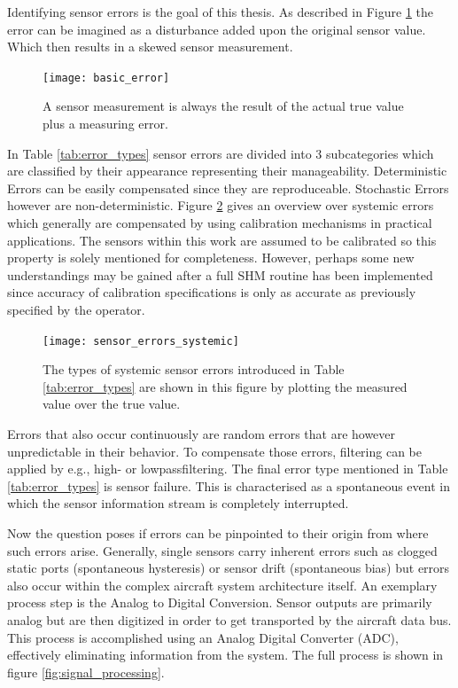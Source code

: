 Identifying sensor errors is the goal of this thesis. As described in Figure \ref{fig:basic_error} the error can be imagined as a disturbance added upon the original sensor value. Which then results in a skewed sensor measurement.
\begin{figure}[ht]
    \centering
    \texttt{[image: basic\_error]}
    \caption{A sensor measurement is always the result of the actual true value plus a measuring error.}
    \label{fig:basic_error}
\end{figure}
In Table \ref{tab:error_types} sensor errors are divided into 3 subcategories which are classified by their appearance representing their manageability. Deterministic Errors can be easily compensated since they are reproduceable. Stochastic Errors however are non-deterministic. Figure \ref{fig:sensor_errors_systemic} gives an overview over systemic errors which generally are compensated by using calibration mechanisms in practical applications. The sensors within this work are assumed to be calibrated so this property is solely mentioned for completeness. However, perhaps some new understandings may be gained after a full SHM routine has been implemented since accuracy of calibration specifications is only as accurate as previously specified by the operator.

\begin{figure}[h]
    \centering
    \texttt{[image: sensor\_errors\_systemic]}
    \caption[Systemic Sensor Errors]{The types of systemic sensor errors introduced in Table \ref{tab:error_types} are shown in this figure by plotting the measured value over the true value. \cite{hartmann_navigation-sensordatenfusion_2022, din_din_1995} }
    \label{fig:sensor_errors_systemic}
\end{figure}

Errors that also occur continuously are random errors that are however unpredictable in their behavior. To compensate those errors, filtering can be applied by e.g., high- or lowpassfiltering. The final error type mentioned in Table \ref{tab:error_types} is sensor failure. This is characterised as a spontaneous event in which the sensor information stream is completely interrupted.


Now the question poses if errors can be pinpointed to their origin from where such errors arise. Generally, single sensors carry inherent errors such as clogged static ports (spontaneous hysteresis) or sensor drift (spontaneous bias) but errors also occur within the complex aircraft system architecture itself. An exemplary process step is the Analog to Digital Conversion. Sensor outputs are primarily analog but are then digitized in order to get transported by the aircraft data bus. This process is accomplished using an Analog Digital Converter (ADC), effectively eliminating information from the system. The full process is shown in figure \ref{fig:signal_processing}.

